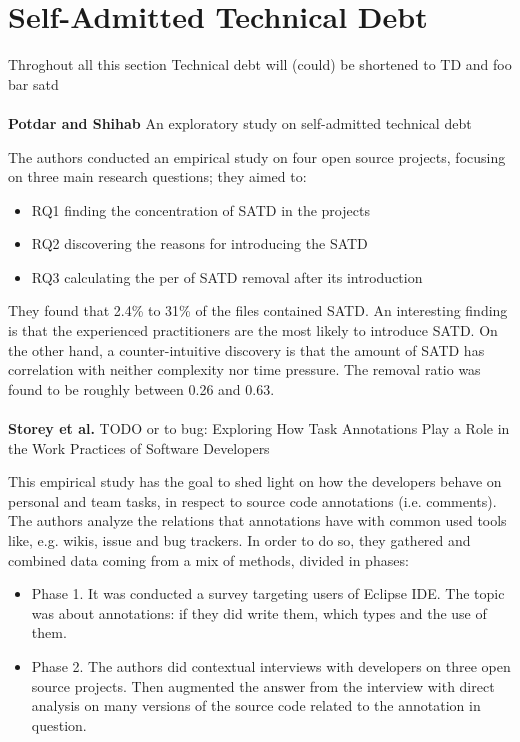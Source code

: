 \section{Self-Admitted Technical Debt} %

Throghout all this section Technical debt will (could) be shortened to TD and foo bar satd
\\
\\
\textbf{Potdar and Shihab} \cite{potdar2014exploratory} An exploratory study on self-admitted technical debt

The authors conducted an empirical study on four open source projects, focusing on three main research questions; they aimed to:
\begin{itemize}
    \item RQ1 finding the concentration of SATD in the projects
    \item RQ2 discovering the reasons for introducing the SATD
    \item RQ3 calculating the per of SATD removal after its introduction
\end{itemize}

They found that 2.4\% to 31\% of the files contained SATD. An interesting finding is that the experienced practitioners are the most likely to introduce SATD. On the other hand, a counter-intuitive discovery is that the amount of SATD has correlation with neither complexity nor time pressure. The removal ratio was found to be roughly between 0.26 and 0.63.
\\
\\
\textbf{Storey et al.} \cite{storey2008todo} TODO or to bug: Exploring How Task Annotations Play a Role in the Work Practices of Software Developers

This empirical study has the goal to shed light on how the developers behave on personal and team tasks, in respect to source code annotations (i.e. comments).
The authors analyze the relations that annotations have with common used tools like, e.g. wikis, issue and bug trackers. In order to do so, they gathered and combined data coming from a mix of methods, divided in phases:
\begin{itemize}
    \item Phase 1. It was conducted a survey targeting users of Eclipse IDE. The topic was about annotations: if they did write them, which types and the use of them.
    \item Phase 2. The authors did contextual interviews with developers on three open source projects. Then augmented the answer from the interview with direct analysis on many versions of the source code related to the annotation in question.
\end{itemize}

